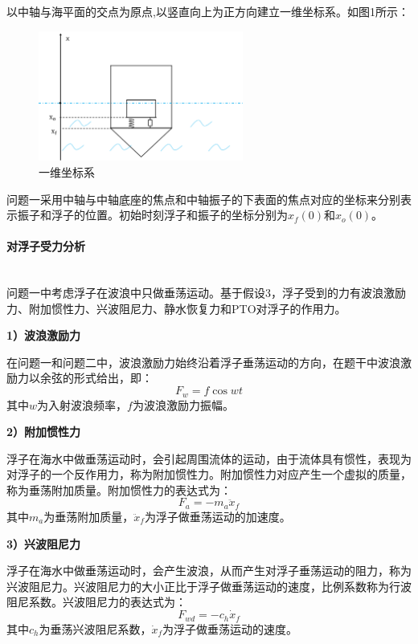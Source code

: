 \documentclass{my_paper}
\newcommand{\subsubsubsection}[1]{\paragraph{#1}\mbox{}\\}
\begin{document}
以中轴与海平面的交点为原点,以竖直向上为正方向建立一维坐标系。如图1所示：
\begin{figure}[!h]

    \centering
    \includegraphics[width=0.6\textwidth]{建系.png}
        \caption[]{一维坐标系}
\end{figure}

\newpage
问题一采用中轴与中轴底座的焦点和中轴振子的下表面的焦点对应的坐标来分别表示振子和浮子的位置。初始时刻浮子和振子的坐标分别为$x_{f}(0)$和$x_{o}(0)$。


\subsubsubsection{对浮子受力分析}

问题一中考虑浮子在波浪中只做垂荡运动。基于假设3，浮子受到的力有波浪激励力、附加惯性力、兴波阻尼力、静水恢复力和PTO对浮子的作用力。


\textbf{1）波浪激励力}

在问题一和问题二中，波浪激励力始终沿着浮子垂荡运动的方向，在题干中波浪激励力以余弦的形式给出，即：
\begin{equation}
    F_w=f\cos wt\label{Q1fbolanjilili}
\end{equation}
其中$w$为入射波浪频率，$f$为波浪激励力振幅。

\textbf{2）附加惯性力}

浮子在海水中做垂荡运动时，会引起周围流体的运动，由于流体具有惯性，表现为对浮子的一个反作用力，称为附加惯性力。附加惯性力对应产生一个虚拟的质量，称为垂荡附加质量。附加惯性力的表达式为：
\begin{equation}
    F_a=-m_{a}\ddot x_{f}\label{Q1ffujiaguanxingli}
\end{equation}
其中$m_{a}$为垂荡附加质量，$\ddot x_{f}$为浮子做垂荡运动的加速度。

\textbf{3）兴波阻尼力}

浮子在海水中做垂荡运动时，会产生波浪，从而产生对浮子垂荡运动的阻力，称为兴波阻尼力。兴波阻尼力的大小正比于浮子做垂荡运动的速度，比例系数称为行波阻尼系数。兴波阻尼力的表达式为：
\begin{equation}
    F_{wd}=-c_{h}\dot x_{f}\label{Q1fxingbozunili}
\end{equation}
其中$c_{h}$为垂荡兴波阻尼系数，$\dot x_{f}$为浮子做垂荡运动的速度。
\end{document}
